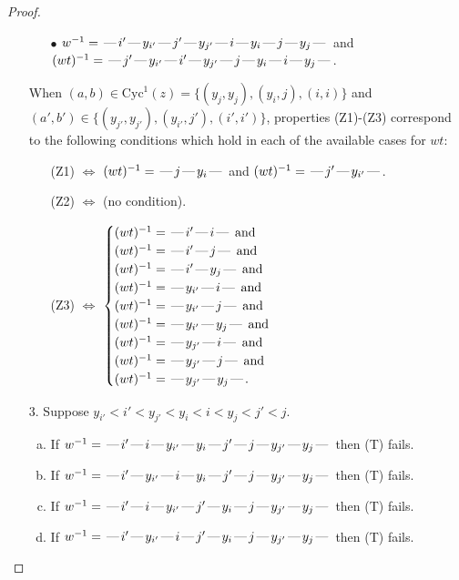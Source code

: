 \documentclass[10pt]{article}
\theoremstyle{definition}
\theoremstyle{definition}
\def\dash{\text{\hspace{0.5mm}---\hspace{0.5mm}}}
\def\Cyc{\mathrm{Cyc}}
\begin{document}
\begin{proof}
\begin{enumerate}
\begin{enumerate}
\item[$\bullet$] $w^{-1} = \dash i'\dash y_{i'}\dash j'\dash y_{j'}\dash i\dash y_i\dash j\dash y_j\dash $ and $(wt)^{-1} = \dash j'\dash y_{i'}\dash i'\dash y_{j'}\dash j\dash y_i\dash i\dash y_j\dash $.
\end{enumerate}
When $(a,b)\in\Cyc^1(z)=\{(y_j,y_j),(y_i,j),(i,i)\}$ and $(a',b')\in\{(y_{j'},y_{j'}),(y_{i'},j'),(i',i')\}$,
properties (Z1)-(Z3) correspond to the following conditions which
hold in each of the available cases for $wt$:
\begin{enumerate}
\item[](Z1) $\Leftrightarrow$ $(wt)^{-1} = \dash j \dash y_i \dash$  and $(wt)^{-1} = \dash j' \dash y_{i'} \dash$.
\item[](Z2) $\Leftrightarrow$ (no condition).
\item[](Z3) $\Leftrightarrow$ $\begin{cases}\text{$(wt)^{-1} = \dash i' \dash i \dash$}\text{ and }\\
\text{$(wt)^{-1} = \dash i' \dash j \dash$}\text{ and }\\
\text{$(wt)^{-1} = \dash i' \dash y_j \dash$}\text{ and }\\
\text{$(wt)^{-1} = \dash y_{i'} \dash i \dash$}\text{ and }\\
\text{$(wt)^{-1} = \dash y_{i'} \dash j \dash$}\text{ and }\\
\text{$(wt)^{-1} = \dash y_{i'} \dash y_j \dash$}\text{ and }\\
\text{$(wt)^{-1} = \dash y_{j'} \dash i \dash$}\text{ and }\\
\text{$(wt)^{-1} = \dash y_{j'} \dash j \dash$}\text{ and }\\
\text{$(wt)^{-1} = \dash y_{j'} \dash y_j \dash$}.\end{cases}$
\end{enumerate}
\item[$3$.] Suppose $y_{i'} < i' < y_{j'} < y_i < i < y_j < j' < j$.
\begin{enumerate}[(a)]
\item If $w^{-1} = \dash i'\dash i\dash y_{i'}\dash y_i\dash j'\dash j\dash y_{j'}\dash y_j\dash $ then (T) fails.
\item If $w^{-1} = \dash i'\dash y_{i'}\dash i\dash y_i\dash j'\dash j\dash y_{j'}\dash y_j\dash $ then (T) fails.
\item If $w^{-1} = \dash i'\dash i\dash y_{i'}\dash j'\dash y_i\dash j\dash y_{j'}\dash y_j\dash $ then (T) fails.
\item If $w^{-1} = \dash i'\dash y_{i'}\dash i\dash j'\dash y_i\dash j\dash y_{j'}\dash y_j\dash $ then (T) fails.

\end{enumerate}
\end{enumerate}
\end{proof}
\end{document}
